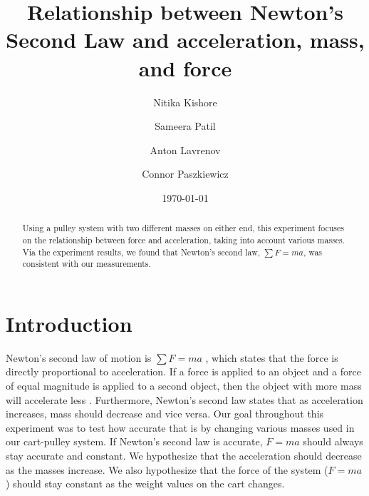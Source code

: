 ﻿\documentclass[reprint,amsmath,amssymb.aps]{revtex4-2}
\begin{document}
\title{Relationship between Newton’s Second Law and acceleration, mass, and force}
\author{Nitika Kishore}
\author{Sameera Patil}
\author{Anton Lavrenov}
\author{Connor Paszkiewicz}
\date{\today}

\begin{abstract}
Using a pulley system with two different masses on either end, this experiment focuses on the relationship between force and acceleration, taking into account various masses. Via the experiment results, we found that Newton’s second law, $\sum F = ma$, was consistent with our measurements. 
\end{abstract}


\maketitle
  
\section{Introduction}
Newton's second law of motion is $\sum F=ma$ \cite{tipler}, which states that the force is directly proportional to acceleration. If a force is applied to an object and a force of equal magnitude is applied to a second object, then the object with more mass will accelerate less \cite{tipler}. Furthermore, Newton’s second law states that as acceleration increases, mass should decrease and vice versa. Our goal throughout this experiment was to test how accurate that is by changing various masses used in our cart-pulley system. If Newton’s second law is accurate, $F=ma$ should always stay accurate and constant. We hypothesize that the acceleration should decrease as the masses increase. We also hypothesize that the force of the system ($F=ma$) should stay constant as the weight values on the cart changes. 
\end{document}
